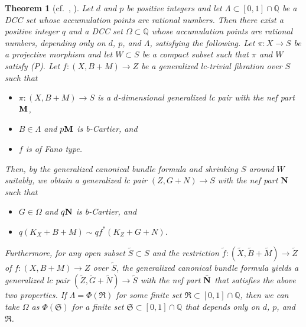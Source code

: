 \documentclass[12pt]{amsart}
\newtheorem{thm}{Theorem}[section]
\theoremstyle{definition}
\begin{document}
\begin{thm}[cf.~{\cite[Theorem 1.5]{filipazzi-moraga}, \cite[Proposition 3.4]{chhx-compl}}]\label{thm--can-bundle-formula-coeff-inherited}
Let $d$ and $p$ be positive integers and let $\Lambda  \subset [0,1] \cap \mathbb{Q}$ be a DCC set whose accumulation points are rational numbers. 
Then there exist a positive integer $q$ and a DCC set $\Omega \subset \mathbb{Q}$ whose accumulation points are rational numbers, depending only on $d$, $p$, and $\Lambda$, satisfying the following. 
Let $\pi \colon X\to S$ be a projective morphism and let $W \subset S$ be a compact subset such that $\pi$ and $W$ satisfy (P). 
Let $f\colon (X,B+M) \to Z$ be a generalized lc-trivial fibration over $S$ such that
\begin{itemize}
\item
$\pi \colon (X,B+M) \to S$ is a $d$-dimensional generalized lc pair with the nef part $\boldsymbol{\rm M}$,
\item
$B \in \Lambda$ and $p\boldsymbol{\rm M}$ is b-Cartier, and 
\item
$f$ is of Fano type.
\end{itemize}
Then, by the generalized canonical bundle formula and shrinking $S$ around $W$ suitably, we obtain a generalized lc pair $(Z, G +N) \to S$ with the nef part $\boldsymbol{\rm N}$ such that
\begin{itemize}
\item
$G \in \Omega$ and $q\boldsymbol{\rm N}$ is b-Cartier, and 
\item
$q(K_{X}+B+M) \sim qf^{*}(K_{Z}+G+N)$.
\end{itemize}
Furthermore, for any open subset $\tilde{S} \subset S$ and the restriction $\tilde{f} \colon (\tilde{X},\tilde{B}+\tilde{M}) \to \tilde{Z}$ of $f\colon (X,B+M) \to Z$ over $\tilde{S}$, the generalized canonical bundle formula yields a generalized lc pair $(\tilde{Z}, \tilde{G} +\tilde{N}) \to \tilde{S}$ with the nef part $\tilde{\boldsymbol{\rm N}}$ that satisfies the above two properties. 
If $\Lambda= \Phi(\mathfrak{R})$ for some finite set $\mathfrak{R} \subset [0,1] \cap \mathbb{Q}$, then we can take $\Omega$ as $\Phi(\mathfrak{S})$ for a finite set $\mathfrak{S} \subset [0,1] \cap \mathbb{Q}$ that depends only on $d$, $p$, and $\mathfrak{R}$. 
\end{thm}
\end{document}
